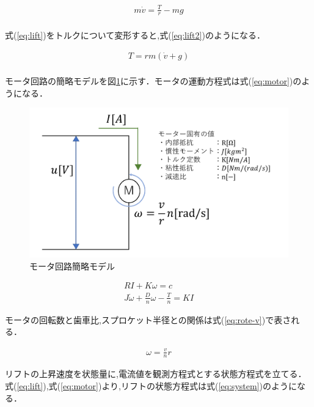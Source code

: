 \begin{eqnarray}
m\dot{v}=\frac{T}{r}-mg\\
\label{eq:lift}
\end{eqnarray}

式(\ref{eq:lift})をトルクについて変形すると,式(\ref{eq:lift2})のようになる．

\begin{eqnarray}
T=rm(\dot{v}+g)\\
\label{eq:lift2}
\end{eqnarray}

モータ回路の簡略モデルを図\ref{fig:circuitmodel}に示す．モータの運動方程式は式(\ref{eq:motor})のようになる．

\begin{figure}[htbp]
  \begin{center}
    \includegraphics[width=150mm]{img/circuitmodel.png}
    \end{center}
  \caption{モータ回路簡略モデル}
 \label{fig:circuitmodel}
\end{figure}

\begin{eqnarray}
RI+K{\omega}=c\\
J\dot{\omega}+\frac{D}{n}{\omega}-\frac{T}{n}=KI
\label{eq:motor}
\end{eqnarray}

モータの回転数と歯車比,スプロケット半径との関係は式(\ref{eq:rote-v})で表される．

\begin{eqnarray}
{\omega}=\frac{v}{n}r
\label{eq:rote-v}
\end{eqnarray}

リフトの上昇速度を状態量に,電流値を観測方程式とする状態方程式を立てる．式(\ref{eq:lift}),式(\ref{eq:motor})より,リフトの状態方程式は式(\ref{eq:system})のようになる．

